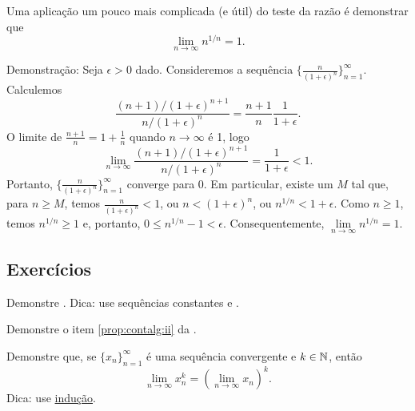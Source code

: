 \begin{example} \label{example:nto1overn}
Uma aplicação um pouco mais complicada (e útil) do teste da razão é demonstrar que
\begin{equation*}
\lim_{n\to\infty} n^{1/n} = 1 .
\end{equation*}

Demonstração:
Seja $\epsilon > 0$ dado. Consideremos a sequência
$\bigl\{ \frac{n}{{(1+\epsilon)}^n} \bigr\}_{n=1}^\infty$. Calculemos
\begin{equation*}
\frac{(n+1)/{(1+\epsilon)}^{n+1}}{n/{(1+\epsilon)}^{n}}
=
\frac{n+1}{n} \frac{1}{1+\epsilon} .
\end{equation*}
O limite de $\frac{n+1}{n} = 1+\frac{1}{n}$ quando $n \to \infty$ é 1, logo
\begin{equation*}
\lim_{n\to \infty} \frac{(n+1)/{(1+\epsilon)}^{n+1}}{n/{(1+\epsilon)}^{n}}
=
\frac{1}{1+\epsilon} < 1 .
\end{equation*}
Portanto, $\bigl\{ \frac{n}{{(1+\epsilon)}^n} \bigr\}_{n=1}^\infty$ converge para 0.
Em particular,
existe um $M$ tal que, para $n \geq M$, temos
$\frac{n}{{(1+\epsilon)}^n} < 1$, ou
$n < {(1+\epsilon)}^n$, ou
$n^{1/n} < 1+\epsilon$. Como $n \geq 1$, temos $n^{1/n} \geq 1$ e,
portanto, $0 \leq n^{1/n}-1 < \epsilon$. Consequentemente,
$\lim\limits_{n\to\infty} n^{1/n} = 1$.
\end{example}

\subsection{Exercícios}

\begin{exercise}
Demonstre . Dica: use sequências constantes
e .
\end{exercise}

\begin{exercise}
Demonstre o item \ref{prop:contalg:ii} da .
\end{exercise}

\begin{exercise}
Demonstre que, se $\{ x_n \}_{n=1}^\infty$ é uma sequência convergente e $k \in {\mathbb{N}}$, então
\begin{equation*}
\lim_{n\to\infty} x_n^k =
{\left( \lim_{n\to\infty} x_n \right)}^k .
\end{equation*}
Dica: use \hyperref[induction:thm]{indução}.
\end{exercise}

